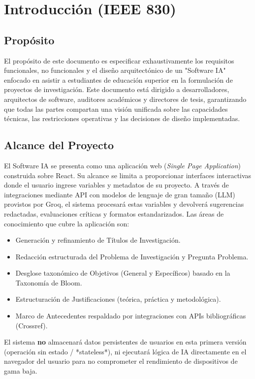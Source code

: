 \section{Introducción (IEEE 830)}

\subsection{Propósito}
El propósito de este documento es especificar exhaustivamente los requisitos funcionales, no funcionales y el diseño arquitectónico de un "Software IA" enfocado en asistir a estudiantes de educación superior en la formulación de proyectos de investigación. Este documento está dirigido a desarrolladores, arquitectos de software, auditores académicos y directores de tesis, garantizando que todas las partes compartan una visión unificada sobre las capacidades técnicas, las restricciones operativas y las decisiones de diseño implementadas.

\subsection{Alcance del Proyecto}
El Software IA se presenta como una aplicación web (\textit{Single Page Application}) construida sobre React. Su alcance se limita a proporcionar interfaces interactivas donde el usuario ingrese variables y metadatos de su proyecto. A través de integraciones mediante API con modelos de lenguaje de gran tamaño (LLM) provistos por Groq, el sistema procesará estas variables y devolverá sugerencias redactadas, evaluaciones críticas y formatos estandarizados. 
Las áreas de conocimiento que cubre la aplicación son:
\begin{itemize}
    \item Generación y refinamiento de Títulos de Investigación.
    \item Redacción estructurada del Problema de Investigación y Pregunta Problema.
    \item Desglose taxonómico de Objetivos (General y Específicos) basado en la Taxonomía de Bloom.
    \item Estructuración de Justificaciones (teórica, práctica y metodológica).
    \item Marco de Antecedentes respaldado por integraciones con APIs bibliográficas (Crossref).
\end{itemize}
El sistema \textbf{no} almacenará datos persistentes de usuarios en esta primera versión (operación sin estado / *stateless*), ni ejecutará lógica de IA directamente en el navegador del usuario para no comprometer el rendimiento de dispositivos de gama baja.

